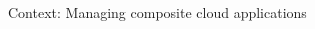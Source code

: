 \documentclass{beamer}
\begin{document}
  \begin{frame}[t]{Context: Managing composite cloud applications}
    \vspace*{-2.8em}
    \begin{columns}[T]
      \begin{column}{.3\textwidth}
        \centering
      \end{column}
    \end{columns}


\end{frame}
\end{document}
